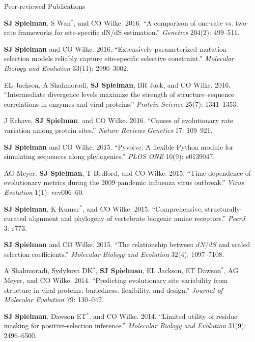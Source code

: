 \documentclass{resume} %
\begin{document}
\begin{rSection}{Peer-reviewed Publications}
\begin{etaremune}[leftmargin=1.5em]
\item \textbf{SJ Spielman}, S Wan$^\ast$, and CO Wilke. 2016. ``A comparison of one-rate vs. two-rate frameworks for site-specific dN/dS estimation.'' \emph{Genetics} 204(2): 499--511.

\item \textbf{SJ Spielman} and CO Wilke. 2016. ``Extensively parameterized mutation--selection models reliably capture site-specific selective constraint.'' \emph{Molecular Biology and Evolution} 33(11): 2990--3002.

\item EL Jackson, A Shahmoradi, \textbf{SJ Spielman}, BR Jack, and CO Wilke. 2016. ``Intermediate divergence levels maximize the strength of structure--sequence correlations in enzymes and viral proteins.'' \emph{Protein Science} 25(7): 1341--1353.

\item J Echave, \textbf{SJ Spielman}, and CO Wilke. 2016. ``Causes of evolutionary rate variation among protein sites.'' \emph{Nature Reviews Genetics} 17: 109--921.

\item \textbf{SJ Spielman} and CO Wilke. 2015. ``Pyvolve: A flexible Python module for simulating sequences along phylogenies.'' \emph{PLOS ONE} 10(9): e0139047.

\item AG Meyer, \textbf{SJ Spielman}, T Bedford, and CO Wilke. 2015. ``Time dependence of evolutionary metrics during the 2009 pandemic influenza virus outbreak.'' \emph{Virus Evolution} 1(1): vev006--60.

\item \textbf{SJ Spielman}, K Kumar$^\ast$, and CO Wilke. 2015. ``Comprehensive, structurally-curated alignment and phylogeny of vertebrate biogenic amine receptors.'' \emph{PeerJ} 3: e773.

\item \textbf{SJ Spielman} and CO Wilke. 2015. ``The relationship between $dN/dS$ and scaled selection coefficients.'' \emph{Molecular Biology and Evolution} 32(4): 1097--7108.

\item A Shahmoradi, Sydykova DK$^\ast$, \textbf{SJ Spielman}, EL Jackson, ET Dawson$^\ast$, AG Meyer, and CO Wilke. 2014. ``Predicting evolutionary site variability from structure in viral proteins: buriedness, flexibility, and design.'' \emph{Journal of Molecular Evolution} 79: 130--042.

\item \textbf{SJ Spielman}, Dawson ET$^\ast$, and CO Wilke. 2014. ``Limited utility of residue masking for positive-selection inference.'' \emph{Molecular Biology and Evolution} 31(9): 2496--6500.


\end{etaremune}
\end{rSection}
\end{document}
